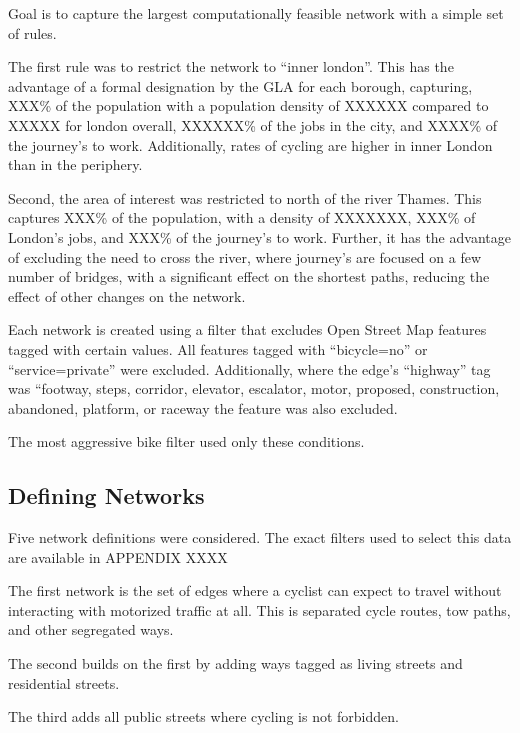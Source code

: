 \documentclass[11pt]{article} %
\begin{document}
Goal is to capture the largest computationally feasible network with a simple set of rules. 

The first rule was to restrict the network to ``inner london''. This has the advantage of a formal designation by the GLA for each borough, capturing, XXX\% of the population with a population density of XXXXXX compared to XXXXX for london overall, XXXXXX\% of the jobs in the city, and XXXX\% of the journey's to work. Additionally, rates of cycling are higher in inner London than in the periphery. 

Second, the area of interest was restricted to north of the river Thames. This captures XXX\% of the population, with a density of XXXXXXX, XXX\% of London's jobs, and XXX\% of the journey's to work. Further, it has the advantage of excluding the need to cross the river, where journey's are focused on a few number of bridges, with a significant effect on the shortest paths, reducing the effect of other changes on the network. 


Each network is created using a filter that excludes Open Street Map features tagged with certain values. All features tagged with ``bicycle=no'' or ``service=private'' were excluded. Additionally, where the edge's ``highway'' tag was ``footway, steps, corridor, elevator, escalator, motor, proposed, construction, abandoned, platform, or raceway the feature was also excluded. 

The most aggressive bike filter used only these conditions.





 

\subsection{Defining Networks}

Five network definitions were considered. The exact filters used to select this data are available in APPENDIX XXXX 

The first network is the set of edges where a cyclist can expect to travel without interacting with motorized traffic at all. This is separated cycle routes, tow paths, and other segregated ways. 

The second builds on the first by adding ways tagged as living streets and residential streets.

The third adds all public streets where cycling is not forbidden. 
\end{document}
